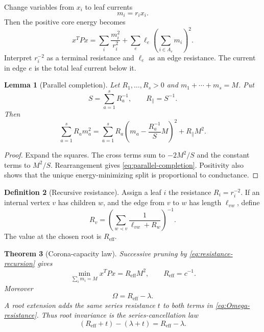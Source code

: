 \documentclass[11pt,a4paper]{amsart}
\theoremstyle{plain}
\newtheorem{theorem}{Theorem}[section]
\newtheorem{lemma}[theorem]{Lemma}
\theoremstyle{definition}
\newtheorem{definition}[theorem]{Definition}
\begin{document}
Change variables from $x_i$ to leaf currents
\begin{equation}\label{eq:current-change}
                         m_i=r_ix_i.
\end{equation}
Then the positive core energy becomes
\begin{equation}\label{eq:electrical-energy}
 x^TPx=\sum_i\frac{m_i^2}{r_i^2}
       +\sum_e\ell_e\left(\sum_{i\in A_e}m_i\right)^2.
\end{equation}
Interpret $r_i^{-2}$ as a terminal resistance and $\ell_e$ as an edge resistance.  The current in
edge $e$ is the total leaf current below it.

\begin{lemma}[Parallel completion]\label{lem:parallel}
Let $R_1,\dots,R_s>0$ and $m_1+\cdots+m_s=M$.  Put
\[
 S=\sum_{a=1}^sR_a^{-1},\qquad R_{\parallel}=S^{-1}.
\]
Then
\begin{equation}\label{eq:parallel-completion}
 \sum_{a=1}^sR_am_a^2
 =\sum_{a=1}^sR_a\left(m_a-\frac{R_a^{-1}}{S}M\right)^2
  +R_{\parallel}M^2.
\end{equation}
\end{lemma}

\begin{proof}
Expand the squares.  The cross terms sum to $-2M^2/S$ and the constant terms to $M^2/S$.
Rearrangement gives \eqref{eq:parallel-completion}.  Positivity also shows that the unique
energy-minimizing split is proportional to conductance.
\end{proof}

\begin{definition}[Recursive resistance]\label{def:recursive-R}
Assign a leaf $i$ the resistance $R_i=r_i^{-2}$.  If an internal vertex $v$ has children $w$, and
the edge from $v$ to $w$ has length $\ell_{vw}$, define
\begin{equation}\label{eq:resistance-recursion}
                  R_v=\left(\sum_{w\prec v}
                    \frac{1}{\ell_{vw}+R_w}\right)^{-1}.
\end{equation}
The value at the chosen root is $R_{\mathrm{eff}}$.
\end{definition}

\begin{theorem}[Corona-capacity law]\label{thm:corona-capacity}
Successive pruning by \eqref{eq:resistance-recursion} gives
\begin{equation}\label{eq:min-energy}
 \min_{\sum_i m_i=M}x^TPx=R_{\mathrm{eff}}M^2,
 \qquad R_{\mathrm{eff}}=c^{-1}.
\end{equation}
Moreover
\begin{equation}\label{eq:Omega-resistance}
                         \Omega=R_{\mathrm{eff}}-\lambda.
\end{equation}
A root extension adds the same series resistance $t$ to both terms in
\eqref{eq:Omega-resistance}.  Thus root invariance is the series-cancellation law
\[
 (R_{\mathrm{eff}}+t)-(\lambda+t)=R_{\mathrm{eff}}-\lambda.
\]
\end{theorem}
\end{document}
